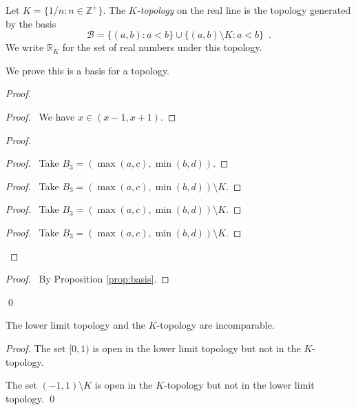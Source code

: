 \begin{df}[$K$-topology]
  Let $K = \{ 1/n : n \in \mathbb{Z}^+ \}$. The \emph{$K$-topology} on the real line is the topology generated by the basis
  \[ \mathcal{B} = \{ (a,b) : a < b \} \cup \{ (a,b) \setminus K : a < b \} \enspace . \]
  We write $\mathbb{R}_K$ for the set of real numbers under this topology.

  We prove this is a basis for a topology.
\end{df}

\begin{proof}
  \pf
  \begin{proof}
    \pf\ We have $x \in (x-1, x+1)$.
  \end{proof}
  \begin{proof}
    \begin{proof}
      \pf\ Take $B_3 = (\max(a,c), \min(b,d))$.
    \end{proof}
    \begin{proof}
      \pf\ Take $B_3 = (\max(a,c), \min(b,d)) \setminus K$.
    \end{proof}
    \begin{proof}
      \pf\ Take $B_3 = (\max(a,c), \min(b,d)) \setminus K$.
    \end{proof}
    \begin{proof}
      \pf\ Take $B_3 = (\max(a,c), \min(b,d)) \setminus K$.
    \end{proof}
  \end{proof}
  \qedstep
  \begin{proof}
    \pf\ By Proposition \ref{prop:basis}.
  \end{proof}
  \qed
\end{proof}

\begin{prop}
  The lower limit topology and the $K$-topology are incomparable.
\end{prop}

\begin{proof}
  \pf

  The set $[0,1)$ is open in the lower limit topology but not in the $K$-topology.

  The set $(-1,1) \setminus K$ is open in the $K$-topology but not in the lower limit topology.
  \qed
\end{proof}

